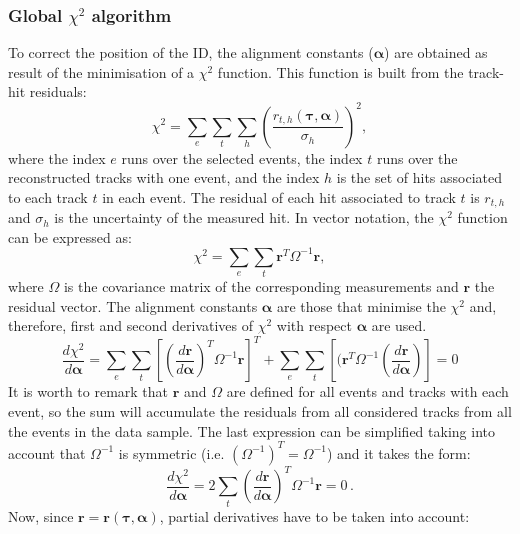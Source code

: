 \subsubsection{Global $\chi^2$ algorithm} %
To correct the position of the ID, the alignment constants ($\bm{\alpha}$) are obtained as result 
of the minimisation of a $\chi^2$ function. This function is built from the track-hit residuals:
\begin{equation*}
	\chi^{2} =  \sum_{e}\sum_{t} \sum_{h} \left( \frac{r_{t,h}(\bm{\tau}, \bm{\alpha})}{\sigma_{h}} \right)^{2},
\end{equation*}
where the index $e$ runs over the selected events, the index $t$ runs over the reconstructed 
tracks with one event, and the index $h$ is the set of hits associated to each 
track $t$ in each event. The residual of each hit associated to track $t$ is $r_{t,h}$ and $\sigma_{h}$ is the uncertainty of the measured hit.
In vector notation, the $\chi^2$ function can be expressed as:
\begin{equation*}
	\chi^{2} =  \sum_{e} \sum_{t} \bm{r}^{T}\Omega^{-1} \bm{r},
\end{equation*}
where $\Omega$ is the covariance matrix of the corresponding measurements
and $\bm{r}$ the residual vector. 
The alignment constants $\bm{\alpha}$ are those that minimise the $\chi^2$ and, therefore,
first and second derivatives of $\chi^2$ with respect $\bm{\alpha}$  are used. %
\begin{equation*}
	\frac{d \chi^{2}}{d \bm{\alpha}} =
	 \sum_{e} \sum_{t} \left[  \left(\frac{d  \bm{r} }{d \bm{\alpha}} \right)^{T} \Omega^{-1} \bm{r} \right]^{T} +
	 \sum_{e} \sum_{t} \left[  (\bm{r}^{T} \Omega^{-1} \left( \frac{d \bm{r}}{d \bm{\alpha}} \right) \right]
	= 0
\end{equation*}
It is worth to remark that $\bm{r}$ and $\Omega$ are defined for all events and tracks with each event, so the sum will 
accumulate the residuals from all considered tracks from all the events in the data sample. The last 
expression can be simplified taking into account that $\Omega^{-1}$ is symmetric (i.e. $(\Omega^{-1})^{T} = \Omega^{-1}$) and it takes the form:
\begin{equation}\label{eq:Chap2:Chi2_A}
	\frac{d \chi^{2}}{d \bm{\alpha}} = 2 \sum_{t} \left(\frac{d  \bm{r} }{d \bm{\alpha}} \right)^{T} \Omega^{-1} \bm{r} = 0 \, .
\end{equation}
Now, since $\bm{r} = \bm{r}(\bm{\tau}, \bm{\alpha})$, partial derivatives have to be taken into account:
